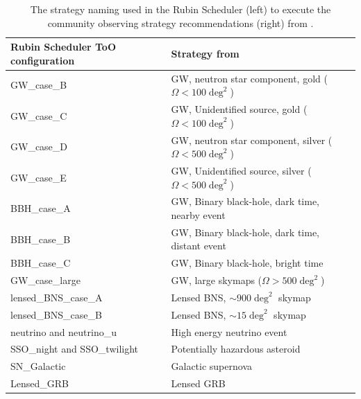 \begin{table}[]
\centering
\begin{tabular}{|l|l|}
\hline
\textbf{Rubin Scheduler ToO configuration} & \textbf{Strategy from \cite{RubinToO2024}} \\ \hline
GW\_case\_B                         & GW, neutron star component, gold ($\Omega <100\deg^2$)                                             \\ \hline
GW\_case\_C                         & GW, Unidentified source, gold ($\Omega <100\deg^2$)                                   \\ \hline
GW\_case\_D                         & GW, neutron star component, silver ($\Omega <500\deg^2$)                                           \\ \hline
GW\_case\_E                         & GW, Unidentified source, silver ($\Omega <500\deg^2$)                                 \\ \hline
BBH\_case\_A                        & GW, Binary black-hole, dark time, nearby event                                     \\ \hline
BBH\_case\_B                        & GW, Binary black-hole, dark time, distant event                                      \\ \hline
BBH\_case\_C                        & GW, Binary black-hole, bright time                                         \\ \hline
GW\_case\_large                     & GW, large skymaps ($\Omega>500\deg^2$)                                    \\ \hline
lensed\_BNS\_case\_A                & Lensed BNS, $\sim900\deg^2$ skymap                                      \\ \hline
lensed\_BNS\_case\_B                & Lensed BNS, $\sim15\deg^2$ skymap                                       \\ \hline
neutrino and neutrino\_u            & High energy neutrino event                                            \\ \hline
SSO\_night and SSO\_twilight                       & Potentially hazardous asteroid                                           \\ \hline
SN\_Galactic                        & Galactic supernova                                  \\ \hline
Lensed\_GRB                         & Lensed GRB                                          \\ \hline
\end{tabular}
\caption{The strategy naming used in the Rubin Scheduler (left) to execute the community observing strategy recommendations (right) from \cite{RubinToO2024}.}
\label{table:ToOStrategies_sched}
\end{table}

